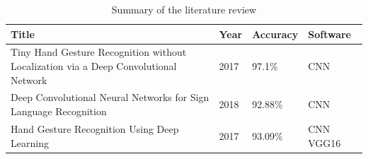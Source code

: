 \documentclass[12pt]{report}
\begin{document}
                    \begin{center}
                        \begin{table}[h]
                            \caption{Summary of the literature review}
                            \begin{tabular}{ |p{7cm}|p{2cm}|p{2cm}|p{3cm}| }
                                \hline
                                Title & Year & Accuracy & Software\\
                                \hline
                                Tiny Hand Gesture Recognition without Localization via a Deep Convolutional Network & 2017 & 97.1\%& CNN \\
                                \hline
                                Deep Convolutional Neural Networks for Sign Language Recognition & 2018 & 92.88\% & CNN \\
                                \hline
                                Hand Gesture Recognition Using Deep Learning & 2017 & 93.09\% & CNN VGG16 \\
                                \hline
                            \end{tabular}
                            \label{table:summary}
                        \end{table}
                    \end{center}
        \newpage
        
                    
        
        
    
\end{document}
